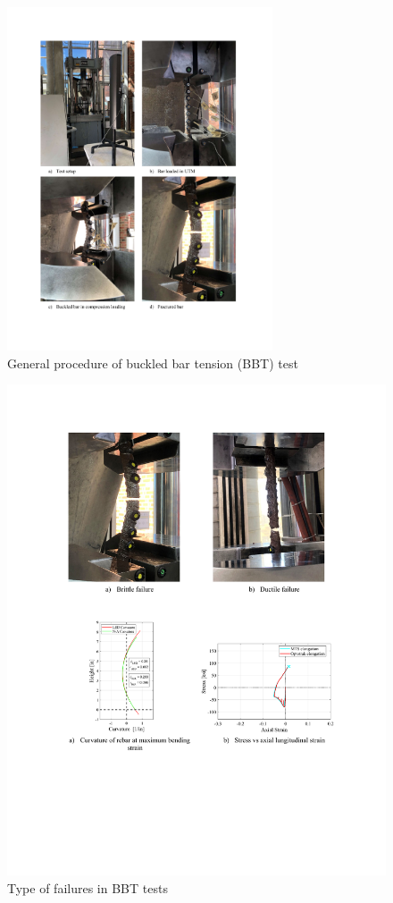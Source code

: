 \begin{figure}[htbp]
	\centering
	\includegraphics[width=0.7\textwidth]{VAC Thesis 2.0/Chapter-4/figs/BBT Procedure.pdf}
	\caption{General procedure of buckled bar tension (BBT) test}
	\label{fig:BBT_Test_Summary}
\end{figure}

\begin{figure}[htbp]
	\centering
    \includegraphics[width=1\textwidth]{VAC Thesis 2.0/Chapter-4/figs/BBT_Brittle_vs_Ductile_fracture.pdf}
	\caption{Type of failures in BBT tests}
	\label{fig:bbt_brittle_vs_duc}
\end{figure}

